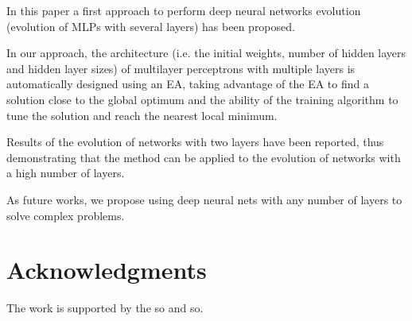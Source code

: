 \documentclass[runningheads]{llncs}
\begin{document}
In this paper a first approach to perform deep neural networks
evolution (evolution of MLPs with several layers) has been proposed.

In our approach, the architecture (i.e. the initial weights, number of
hidden layers and hidden layer sizes) of multilayer perceptrons with
multiple layers is automatically designed using an EA, taking
advantage of the EA to find a solution close to the global optimum and
the ability of the training algorithm to tune the solution and reach
the nearest local minimum. 

Results of the evolution of networks with two layers have been
reported, thus demonstrating that the method can be applied to the
evolution of networks with a high number of layers.

As future works, we propose using deep neural nets with any number of
layers to solve complex problems. 


\section*{Acknowledgments}

The work is
supported by the so and so.



 
\end{document}
